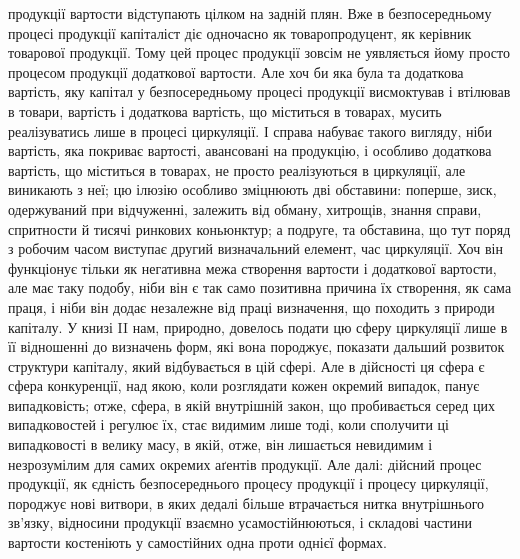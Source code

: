 \parcont{}  %
продукції вартости відступають цілком на задній плян. Вже в безпосередньому
процесі продукції капіталіст діє одночасно як товаропродуцент, як керівник
товарової продукції. Тому цей процес продукції зовсім не уявляється йому просто
процесом продукції додаткової вартости. Але хоч би яка була та додаткова
вартість, яку капітал у безпосередньому процесі продукції висмоктував і втілював
в товари, вартість і додаткова вартість, що міститься в товарах, мусить реалізуватись
лише в процесі циркуляції. І справа набуває такого вигляду, ніби вартість,
яка покриває вартості, авансовані на продукцію, і особливо додаткова
вартість, що міститься в товарах, не просто реалізуються в циркуляції, але виникають
з неї; цю ілюзію особливо зміцнюють дві обставини: поперше, зиск,
одержуваний при відчуженні, залежить від обману, хитрощів, знання справи,
спритности й тисячі ринкових коньюнктур; а подруге, та обставина, що тут
поряд з робочим часом виступає другий визначальний елемент, час циркуляції.
Хоч він функціонує тільки як негативна межа створення вартости і додаткової
вартости, але має таку подобу, ніби він є так само позитивна причина
їх створення, як сама праця, і ніби він додає незалежне від праці визначення,
що походить з природи капіталу. У книзі II нам, природно, довелось подати цю
сферу циркуляції лише в її відношенні до визначень форм, які вона породжує,
показати дальший розвиток структури капіталу, який відбувається в цій сфері.
Але в дійсності ця сфера є сфера конкуренції, над якою, коли розглядати кожен
окремий випадок, панує випадковість; отже, сфера, в якій внутрішній закон,
що пробивається серед цих випадковостей і регулює їх, стає видимим лише тоді,
коли сполучити ці випадковості в велику масу, в якій, отже, він лишається
невидимим і незрозумілим для самих окремих аґентів продукції. Але далі: дійсний
процес продукції, як єдність безпосереднього процесу продукції і процесу
циркуляції, породжує нові витвори, в яких дедалі більше втрачається нитка
внутрішнього зв’язку, відносини продукції взаємно усамостійнюються, і складові
частини вартости костеніють у самостійних одна проти однієї формах.

